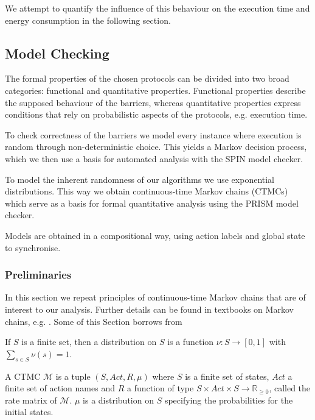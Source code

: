 \documentclass[a4paper, 10pt]{article}
\begin{document}
We attempt to quantify the influence of this behaviour on the execution time and energy consumption in the following section.

\subsection{Model Checking}
\label{ssec:analysis-modelchecking}
The formal properties of the chosen protocols can be divided into two broad categories: functional and quantitative properties. Functional properties describe the supposed behaviour of the barriers, whereas quantitative properties express conditions that rely on probabilistic aspects of the protocols, e.g. execution time.

To check correctness of the barriers we model every instance where execution is random through non-deterministic choice. This yields a Markov decision process, which we then use a basis for automated analysis with the SPIN model checker.

To model the inherent randomness of our algorithms we use exponential distributions. This way we obtain continuous-time Markov chains (CTMCs) which serve as a basis for formal quantitative analysis using the PRISM model checker.

Models are obtained in a compositional way, using action labels and global state to synchronise.

\subsubsection{Preliminaries}
\label{sssec:analysis-modelchecking-preliminaries}
In this section we repeat principles of continuous-time Markov chains that are of interest to our analysis. Further details can be found in textbooks on Markov chains, e.g. \cite{kul95, ks76}. Some of this Section borrows from \cite{bai13}

If $S$ is a finite set, then a distribution on $S$ is a function $\nu:S \rightarrow [0,1]$ with $\sum\limits_{s \in S} \nu (s) = 1$.

A CTMC $\mathcal{M}$ is a tuple $(S, \mathit{Act}, R, \mu)$ where $S$ is a finite set of states, $Act$ a finite set of action names and $R$ a function of type $S \times \mathit{Act} \times S \rightarrow \mathbb{R}_{\ge 0}$, called the rate matrix of $\mathcal{M}$. $\mu$ is a distribution on $S$ specifying the probabilities for the initial states.
\end{document}
